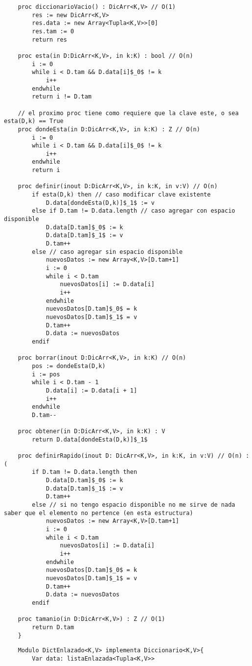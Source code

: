 \documentclass[10pt,a4paper]{article}
\begin{document}
{}

\pagebreak

\begin{lstlisting}
	proc diccionarioVacio() : DicArr<K,V> // O(1)
		res := new DicArr<K,V>
		res.data := new Array<Tupla<K,V>>[0]
		res.tam := 0
		return res
	
	proc esta(in D:DicArr<K,V>, in k:K) : bool // O(n)
		i := 0
		while i < D.tam && D.data[i]$_0$ != k
			i++
		endwhile
		return i != D.tam

	// el proximo proc tiene como requiere que la clave este, o sea esta(D,k) == True
	proc dondeEsta(in D:DicArr<K,V>, in k:K) : Z // O(n)
		i := 0 
		while i < D.tam && D.data[i]$_0$ != k
			i++
		endwhile
		return i

	proc definir(inout D:DicArr<K,V>, in k:K, in v:V) // O(n)
		if esta(D,k) then // caso modificar clave existente
			D.data[dondeEsta(D,k)]$_1$ := v
		else if D.tam != D.data.length // caso agregar con espacio disponible
			D.data[D.tam]$_0$ := k
			D.data[D.tam]$_1$ := v
			D.tam++
		else // caso agregar sin espacio disponible 
			nuevosDatos := new Array<K,V>[D.tam+1]
			i := 0 
			while i < D.tam 
				nuevosDatos[i] := D.data[i]
				i++
			endwhile
			nuevosDatos[D.tam]$_0$ = k
			nuevosDatos[D.tam]$_1$ = v
			D.tam++
			D.data := nuevosDatos
		endif

	proc borrar(inout D:DicArr<K,V>, in k:K) // O(n)
		pos := dondeEsta(D,k)
		i := pos
		while i < D.tam - 1
			D.data[i] := D.data[i + 1]
			i++
		endwhile
		D.tam--
		
	proc obtener(in D:DicArr<K,V>, in k:K) : V
		return D.data[dondeEsta(D,k)]$_1$

	proc definirRapido(inout D: DicArr<K,V>, in k:K, in v:V) // O(n) :(
		if D.tam != D.data.length then 
			D.data[D.tam]$_0$ := k
			D.data[D.tam]$_1$ := v
			D.tam++
		else // si no tengo espacio disponible no me sirve de nada saber que el elemento no pertence (en esta estructura)
			nuevosDatos := new Array<K,V>[D.tam+1]
			i := 0 
			while i < D.tam 
				nuevosDatos[i] := D.data[i]
				i++
			endwhile
			nuevosDatos[D.tam]$_0$ = k
			nuevosDatos[D.tam]$_1$ = v
			D.tam++
			D.data := nuevosDatos
		endif
	
	proc tamanio(in D:DicArr<K,V>) : Z // O(1)
		return D.tam
	}
\end{lstlisting}


\begin{lstlisting}
	Modulo DictEnlazado<K,V> implementa Diccionario<K,V>{
		Var data: listaEnlazada<Tupla<K,V>>
\end{lstlisting}
\end{document}
